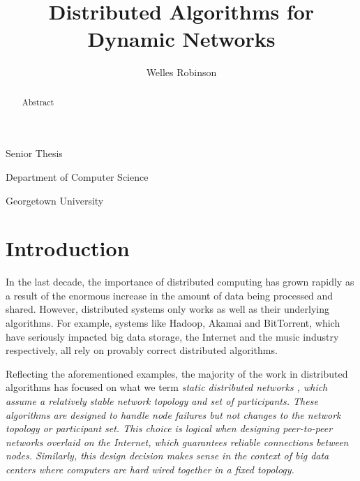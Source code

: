 \documentclass[english]{article}
\begin{document}
\title{Distributed Algorithms for Dynamic Networks}

\maketitle
\begin{center}\author{Welles Robinson}\end{center}
\noindent \begin{center}Senior Thesis\par\end{center}
\noindent \begin{center}Department of Computer
Science\par\end{center}
\noindent \begin{center}Georgetown University\par\end{center}

\newtheorem{definition} {Definition}
\newcommand{\mydef}[1]{\begin{definition}#1\end{definition}}

\begin{abstract}
Abstract
\end{abstract}


\section{Introduction}

In the last decade, the importance of distributed computing has grown rapidly as a result of the enormous increase in the amount of data being processed and shared. However, distributed systems only works as well as their underlying algorithms. For example, systems like Hadoop, Akamai and BitTorrent, which have seriously impacted big data storage, the Internet and the music industry respectively, all rely on provably correct distributed algorithms. 

Reflecting the aforementioned examples, the majority of the work in distributed algorithms has focused on what we term \em static distributed networks \em, which assume a relatively stable network topology and set of participants. These algorithms are designed to handle node failures but not changes to the network topology or participant set. This choice is logical when designing peer-to-peer networks overlaid on the Internet, which guarantees reliable connections between nodes. Similarly, this design decision makes sense in the context of big data centers where computers are hard wired together in a fixed topology. 
\end{document}
